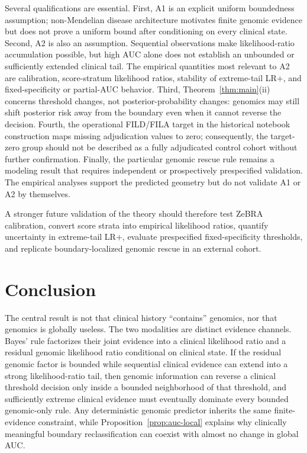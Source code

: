 \documentclass[journal]{IEEEtran}
\begin{document}
Several qualifications are essential. First, A1 is an explicit uniform boundedness assumption; non-Mendelian disease architecture motivates finite genomic evidence but does not prove a uniform bound after conditioning on every clinical state. Second, A2 is also an assumption. Sequential observations make likelihood-ratio accumulation possible, but high AUC alone does not establish an unbounded or sufficiently extended clinical tail. The empirical quantities most relevant to A2 are calibration, score-stratum likelihood ratios, stability of extreme-tail LR$+$, and fixed-specificity or partial-AUC behavior. Third, Theorem~\ref{thm:main}(ii) concerns threshold changes, not posterior-probability changes: genomics may still shift posterior risk away from the boundary even when it cannot reverse the decision. Fourth, the operational FILD/FILA target in the historical notebook construction maps missing adjudication values to zero; consequently, the target-zero group should not be described as a fully adjudicated control cohort without further confirmation. Finally, the particular genomic rescue rule remains a modeling result that requires independent or prospectively prespecified validation. The empirical analyses support the predicted geometry but do not validate A1 or A2 by themselves.

A stronger future validation of the theory should therefore test ZeBRA calibration, convert score strata into empirical likelihood ratios, quantify uncertainty in extreme-tail LR$+$, evaluate prespecified fixed-specificity thresholds, and replicate boundary-localized genomic rescue in an external cohort.

\section{Conclusion}

The central result is not that clinical history ``contains'' genomics, nor that genomics is globally useless. The two modalities are distinct evidence channels. Bayes' rule factorizes their joint evidence into a clinical likelihood ratio and a residual genomic likelihood ratio conditional on clinical state. If the residual genomic factor is bounded while sequential clinical evidence can extend into a strong likelihood-ratio tail, then genomic information can reverse a clinical threshold decision only inside a bounded neighborhood of that threshold, and sufficiently extreme clinical evidence must eventually dominate every bounded genomic-only rule. Any deterministic genomic predictor inherits the same finite-evidence constraint, while Proposition~\ref{prop:auc-local} explains why clinically meaningful boundary reclassification can coexist with almost no change in global AUC.
\end{document}
